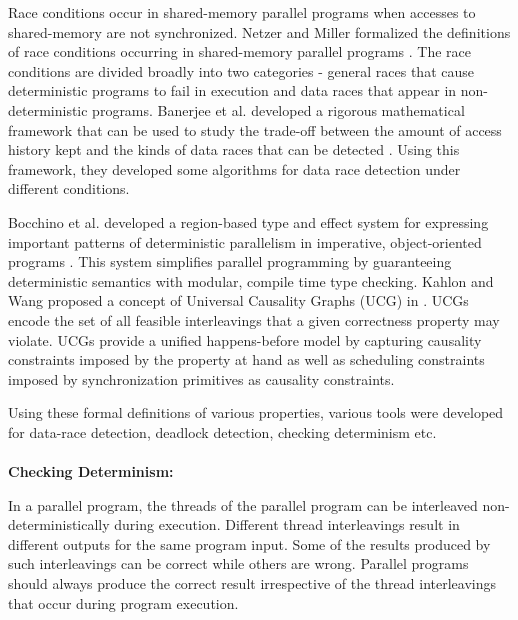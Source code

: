 Race conditions occur in shared-memory parallel programs when accesses to shared-memory are not synchronized. Netzer and Miller formalized the definitions of  race conditions occurring in shared-memory parallel programs \cite{netzer1992race}. The race conditions are divided broadly into two categories - general races that cause deterministic programs to fail in execution and data races that appear in non-deterministic programs. Banerjee et al. developed a rigorous mathematical framework that can be used to study the trade-off between the amount of access history kept and the kinds of data races that can be detected \cite{banerjee2006theory}. Using this framework, they developed some algorithms for data race detection under different conditions.

Bocchino et al. developed a region-based type and effect system for expressing important patterns of deterministic parallelism in imperative, object-oriented programs \cite{bocchino2009type}. This system simplifies parallel programming by guaranteeing deterministic semantics with modular, compile time type checking. Kahlon and Wang proposed a concept of Universal Causality Graphs (UCG) in \cite{kahlon2010universal}. UCGs encode the set of all feasible interleavings that a given correctness property may violate. UCGs provide a unified happens-before model by capturing causality constraints imposed by the property at hand as well as scheduling constraints imposed by synchronization primitives as causality constraints.

Using these formal definitions of various properties, various tools were developed for data-race detection, deadlock detection, checking determinism etc.\\
\\
\textbf{Checking Determinism: }

In a parallel program, the threads of the parallel program can be interleaved non-deterministically during execution. Different thread interleavings result in different outputs for the same program input. Some of the results produced by such interleavings can be correct while others are wrong. Parallel programs should always produce the correct result irrespective of the thread interleavings that occur during program execution.


